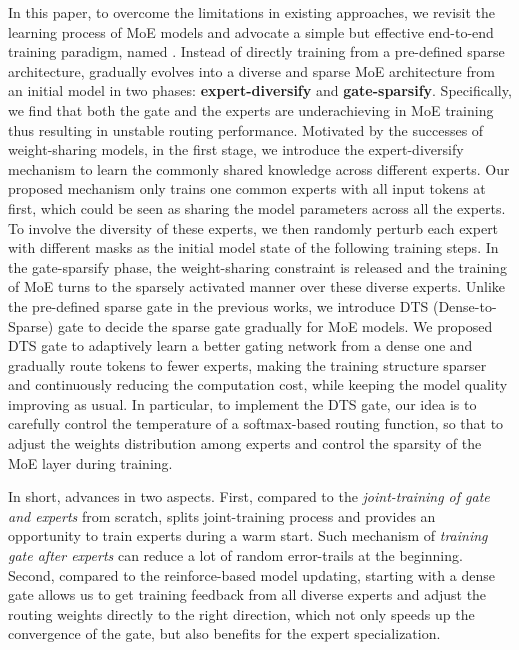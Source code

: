 In this paper, to overcome the limitations in existing approaches, we revisit the learning process of MoE models and advocate a simple but effective end-to-end training paradigm, named \evomoe{}. 
Instead of directly training from a pre-defined sparse architecture, \evomoe{} gradually evolves into a diverse and sparse MoE architecture from an initial model in two phases: \textbf{expert-diversify} and \textbf{gate-sparsify}.
Specifically, we find that both the gate and the experts are underachieving in MoE training thus resulting in unstable routing performance. Motivated by the successes of weight-sharing models, in the first stage, we introduce the expert-diversify mechanism to learn the commonly shared knowledge across different experts.
Our proposed mechanism only trains one common experts with all input tokens at first, which could be seen as sharing the model parameters across all the experts.
To involve the diversity of these experts, we then randomly perturb each expert with different masks as the initial model state of the following training steps.
In the gate-sparsify phase, the weight-sharing constraint is released and the training of MoE turns to the sparsely activated manner over these diverse experts.
Unlike the pre-defined sparse gate in the previous works, we introduce DTS (Dense-to-Sparse) gate to decide the sparse gate gradually for MoE models. We proposed DTS gate to adaptively learn a better gating network from a dense one and gradually route tokens to fewer experts, making the training structure sparser and continuously reducing the computation cost, while keeping the model quality improving as usual.
In particular, to implement the DTS gate, our idea is to carefully control the temperature of a softmax-based routing function, so that to adjust the weights distribution among experts and control the sparsity of the MoE layer during training.

In short, \evomoe advances in two aspects. First, compared to the \textit{joint-training of gate and experts} from scratch, \evomoe splits joint-training process and provides an opportunity to train experts during a warm start. Such mechanism of \textit{training gate after experts} can reduce a lot of random error-trails at the beginning. Second, compared to the reinforce-based model updating, starting with a dense gate allows us to get training feedback from all diverse experts and adjust the routing weights directly to the right direction, which not only speeds up the convergence of the gate, but also benefits for the expert specialization.

